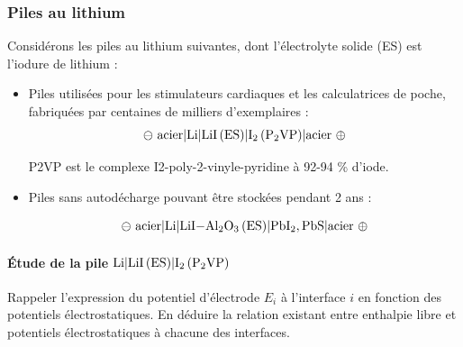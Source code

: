 \subsubsection{Piles au lithium}
\label{subsubsection:piles_au_lithium}

\setcounter{equation}{0}
\setcounter{Q}{0}

Considérons les piles au lithium suivantes, dont l'électrolyte solide (ES) est l'iodure de lithium : 

\begin{itemize}
\item Piles utilisées pour les stimulateurs cardiaques et les calculatrices de poche, fabriquées par centaines de milliers d'exemplaires :
\begin{equation*}
\ominus ~ \text{acier} | \ce{Li} | \ce{LiI (ES)} | \ce{I2 (P2VP)} | \text{acier} ~ \oplus
\end{equation*}

P2VP est le complexe I2-poly-2-vinyle-pyridine à 92-94 \si{\percent} d'iode.
\item Piles sans autodécharge pouvant être stockées pendant 2 ans :

\begin{equation*}
\ominus ~ \text{acier} | \ce{Li}  | \ce{LiI-Al2O3 (ES)} | \ce{PbI2}, \ce{PbS} | \text{acier} ~ \oplus
\end{equation*}



\end{itemize}

\paragraph*{\'{E}tude de la pile $\ce{Li} | \ce{LiI (ES)} | \ce{I2 (P2VP)}$}

\Q \label{Q:01-01a} Rappeler l'expression du potentiel d'électrode $E_i$ à l'interface $i$ en fonction des potentiels électrostatiques. En déduire la relation existant entre enthalpie libre et potentiels électrostatiques à chacune des interfaces.

